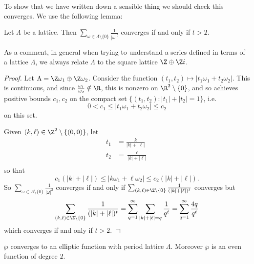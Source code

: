 \documentclass[a4paper]{article}
\begin{document}
To show that we have written down a sensible thing we should check this converges. We use the following lemma:

\begin{lemma}
  Let \(\Lambda\) be a lattice. Then \(\sum_{\omega \in \Lambda \setminus \{0\}} \frac{1}{|\omega|^t}\) converges if and only if \(t > 2\).
\end{lemma}

As a comment, in general when trying to understand a series defined in terms of a lattice \(\Lambda\), we always relate \(\Lambda\) to the square lattice \(\Z \oplus \Z i\).

\begin{proof}
  Let \(\Lambda = \Z \omega_1 \oplus \Z \omega_2\). Consider the function \((t_1, t_2) \mapsto |t_1 \omega_1 + t_2 \omega_2|\). This is continuous, and since \(\frac{\omega_1}{\omega_2} \notin \R\), this is nonzero on \(\R^2 \setminus \{0\}\), and so achieves positive bounds \(c_1, c_2\) on the compact set \(\{(t_1, t_2): |t_1| + |t_2| = 1\}\), i.e.
  \[
    0 < c_1 \leq |t_1 \omega_1 + t_2 \omega_2| \leq c_2
  \]
  on this set.

  Given \((k, \ell) \in \Z^2 \setminus \{(0, 0)\}\), let
  \begin{align*}
    t_1 &= \frac{k}{|k| + |\ell|} \\
    t_2 &= \frac{\ell}{|k| + |\ell|} \\
  \end{align*}
  so that
  \[
    c_1(|k| + |\ell|) \leq |k\omega_1 + \ell \omega_2| \leq c_2(|k| + |\ell|).
  \]
  So \(\sum_{\omega \in \Lambda \setminus \{0\}} \frac{1}{|\omega|^2}\) converges if and only if \(\sum_{(k, \ell) \in \Z \setminus \{0\}} \frac{1}{(|k| + |\ell|)^t}\) converges but
  \[
    \sum_{(k, \ell) \in \Z \setminus \{0\}} \frac{1}{(|k| + |\ell|)^t}
    = \sum_{q = 1}^\infty \sum_{|k| + |\ell| = q} \frac{1}{q^t}
    = \sum_{q = 1}^\infty \frac{4q}{q^t}
  \]
  which converges if and only if \(t > 2\).
\end{proof}

\begin{proposition}
  \(\wp\) converges to an elliptic function with period lattice \(\Lambda\). Moreover \(\wp\) is an even function of degree \(2\).
\end{proposition}
\end{document}
